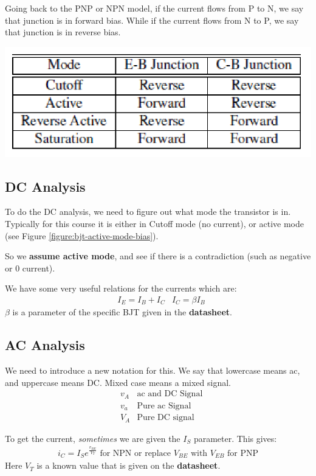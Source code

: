 \documentclass[12pt,letterpaper]{article} \usepackage{amsmath} \usepackage{graphicx} \usepackage[margin=1in]{geometry} \usepackage{longtable}  \usepackage{amssymb}
\begin{document}
	Going back to the PNP or NPN model, if the current flows from P to N, we say that junction is in forward bias. While if the current flows from N to P, we say that junction is in reverse bias. 
	\begin{center}
		\includegraphics[width=0.5\linewidth]{bjt-bias-table}
	\end{center}
	
	\subsection{DC Analysis}
	To do the DC analysis, we need to figure out what mode the transistor is in. Typically for this course it is either in Cutoff mode (no current), or active mode (see Figure \ref{figure:bjt-active-mode-bias}).
	
	So we \textbf{assume active mode}, and see if there is a contradiction (such as negative or 0 current).
	
	We have some very useful relations for the currents which are:
	\begin{align*}
		&I_E = I_B + I_C & I_C = \beta I_B
	\end{align*}
	$\beta$ is a parameter of the specific BJT given in the \textbf{datasheet}.
	
	\subsection{AC Analysis}
	We need to introduce a new notation for this. We say that lowercase means ac, and uppercase means DC. Mixed case means a mixed signal.
	\begin{align*}
		&v_A& \text{ac and DC Signal}\\
		&v_a &\text{Pure ac Signal}\\
		&V_A &\text{Pure DC signal}
	\end{align*}

	To get the current, \textit{sometimes} we are given the $I_S$ parameter. This gives:
	\begin{align*}
		i_C = I_S e^{\frac{v_{BE}}{V_T}} \text{ for NPN or replace $V_{BE}$ with $V_{EB}$ for PNP}
	\end{align*}
	Here $V_T$ is a known value that is given on the \textbf{datasheet}. 
	
\end{document}
